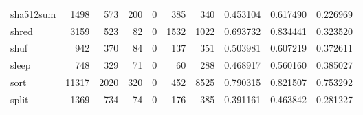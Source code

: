 \begin{longtable}{lrrrrrrrrr}
sha512sum &                                               1498 &                                                573 &                                                200 &                                                  0 &                                                385 &                                                340 &                                           0.453104 &                               0.617490 &                             0.226969 \\
shred     &                                               3159 &                                                523 &                                                 82 &                                                  0 &                                               1532 &                                               1022 &                                           0.693732 &                               0.834441 &                             0.323520 \\
shuf      &                                                942 &                                                370 &                                                 84 &                                                  0 &                                                137 &                                                351 &                                           0.503981 &                               0.607219 &                             0.372611 \\
sleep     &                                                748 &                                                329 &                                                 71 &                                                  0 &                                                 60 &                                                288 &                                           0.468917 &                               0.560160 &                             0.385027 \\
sort      &                                              11317 &                                               2020 &                                                320 &                                                  0 &                                                452 &                                               8525 &                                           0.790315 &                               0.821507 &                             0.753292 \\
split     &                                               1369 &                                                734 &                                                 74 &                                                  0 &                                                176 &                                                385 &                                           0.391161 &                               0.463842 &                             0.281227 \\

\end{longtable}
